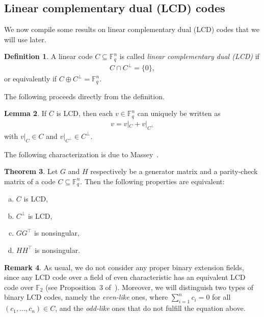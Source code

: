 \documentclass[11pt]{article}
\theoremstyle{definition}
\newtheorem{theorem}{Theorem}[section]
\newtheorem{definition}[theorem]{Definition}
\newtheorem{lemma}[theorem]{Lemma}
\newtheorem{remark}[theorem]{Remark}
\newcommand{\F}{\mathbb{F}}
\begin{document}

\subsection{Linear complementary dual (LCD) codes}

We now compile some results on linear complementary dual (LCD) codes that we will use later.
\begin{definition}
	A linear code $C\subseteq \F_q^n$ is called \emph{linear complementary dual (LCD)} if 
	\begin{align*}
		C \cap C^\perp = \{0\},
	\end{align*}
	or equivalently if $C \oplus C^\perp = \F_q^n$.
\end{definition}

The following proceeds directly from the definition.
\begin{lemma}
	If $C$ is LCD, then each $v\in \F_q^n$ can uniquely be written as
	\begin{align*}
		v = v|_C + v|_{C^\perp}
	\end{align*}
	with $v|_C \in C$ and $v|_{C^\perp} \in C^\perp$.
\end{lemma}

The following characterization is due to Massey~\cite{Mas92}.
\begin{theorem}\label{thm:LCD-equivalence}
	Let $G$ and $H$ respectively be a generator matrix and a parity-check matrix of a code $C\subseteq \F_q^n$.
	Then the following properties are equivalent:
	\begin{enumerate}[(a)]
		\item $C$ is LCD,
		\item $C^\perp$ is LCD,
		\item $GG^\top$ is nonsingular,
		\item $HH^\top$ is nonsingular.
	\end{enumerate}
\end{theorem}

\begin{remark}
	As usual, we do not consider any proper binary extension fields, since any LCD code over a field of even characteristic has an equivalent LCD code over $\F_2$ (see Proposition~3 of~\cite{CG14full}).
	Moreover, we will distinguish two types of binary LCD codes, namely the \emph{even-like} ones, where $\sum_{i = 1}^n c_i = 0$
	for all $(c_1, \ldots, c_n) \in C$, and the \emph{odd-like} ones that do not fulfill the equation above.
\end{remark}
\end{document}
